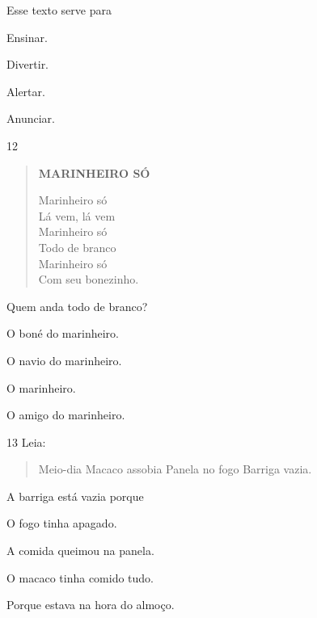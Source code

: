 
Esse texto serve para

\begin{escolha}
\item Ensinar.

\item Divertir.

\item Alertar.

\item Anunciar.
\end{escolha}

\num{12}

\begin{verse}
\textbf{MARINHEIRO SÓ}

Marinheiro só\\
Lá vem, lá vem\\
Marinheiro só\\
Todo de branco\\
Marinheiro só\\
Com seu bonezinho.

\end{verse}


Quem anda todo de branco?

\begin{escolha}
\item O boné do marinheiro.

\item O navio do marinheiro.

\item O marinheiro.

\item O amigo do marinheiro.
\end{escolha}

\num{13} Leia:

\begin{verse}
Meio-dia
Macaco assobia
Panela no fogo
Barriga vazia.
\end{verse}


A barriga está vazia porque

\begin{escolha}
\item O fogo tinha apagado.

\item A comida queimou na panela.

\item O macaco tinha comido tudo.

\item Porque estava na hora do almoço.
\end{escolha}


